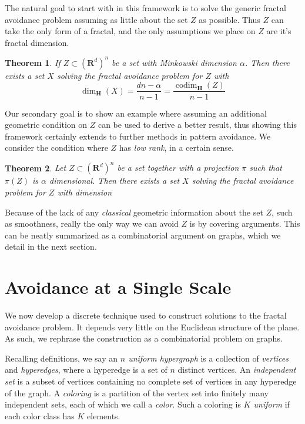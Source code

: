 \documentclass{article}
\theoremstyle{plain}
\theoremstyle{plain}
\newtheorem{theorem}{Theorem}
\DeclareMathOperator{\codim}{codim}
\begin{document}
\begin{multicols}{2}
The natural goal to start with in this framework is to solve the generic fractal avoidance problem assuming as little about the set $Z$ as possible. Thus $Z$ can take the only form of a fractal, and the only assumptions we place on $Z$ are it's fractal dimension.

\begin{theorem}
	If $Z \subset (\mathbf{R}^d)^n$ be a set with Minkowski dimension $\alpha$. Then there exists a set $X$ solving the fractal avoidance problem for $Z$ with
	\[ \dim_{\mathbf{H}}(X) = \frac{dn - \alpha}{n - 1} = \frac{\codim_{\mathbf{H}}(Z)}{n - 1} \]
\end{theorem}

Our secondary goal is to show an example where assuming an additional geometric condition on $Z$ can be used to derive a better result, thus showing this framework certainly extends to further methods in pattern avoidance. We consider the condition where $Z$ has {\it low rank}, in a certain sense.

\begin{theorem}
	Let $Z \subset (\mathbf{R}^d)^n$ be a set together with a projection $\pi$ such that $\pi(Z)$ is $\alpha$ dimensional. Then there exists a set $X$ solving the fractal avoidance problem for $Z$ with dimension
\end{theorem}

Because of the lack of any {\it classical} geometric information about the set $Z$, such as smoothness, really the only way we can avoid $Z$ is by covering arguments. This can be neatly summarized as a combinatorial argument on graphs, which we detail in the next section.

\section{Avoidance at a Single Scale}

We now develop a discrete technique used to construct solutions to the fractal avoidance problem. It depends very little on the Euclidean structure of the plane. As such, we rephrase the construction as a combinatorial problem on graphs.

Recalling definitions, we say an {\it $n$ uniform hypergraph} is a collection of {\it vertices} and {\it hyperedges}, where a hyperedge is a set of $n$ distinct vertices. An {\it independent set} is a subset of vertices containing no complete set of vertices in any hyperedge of the graph. A {\it coloring} is a partition of the vertex set into finitely many independent sets, each of which we call a {\it color}. Such a coloring is {\it $K$ uniform} if each color class has $K$ elements.


\end{multicols}
\end{document}
